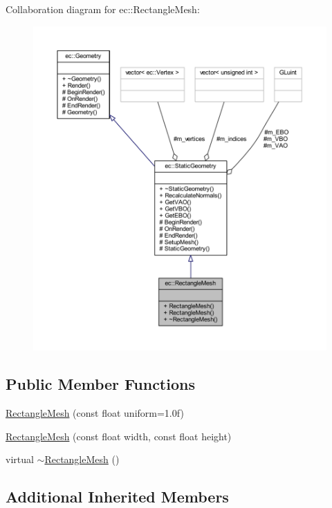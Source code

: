 Collaboration diagram for ec\+:\+:Rectangle\+Mesh\+:
\nopagebreak
\begin{figure}[H]
\begin{center}
\leavevmode
\includegraphics[width=350pt]{classec_1_1_rectangle_mesh__coll__graph}
\end{center}
\end{figure}
\subsection*{Public Member Functions}
\begin{DoxyCompactItemize}
\item 
\mbox{\hyperlink{classec_1_1_rectangle_mesh_aa75e834f688d15a8ec8162e7a9ed1c05}{Rectangle\+Mesh}} (const float uniform=1.\+0f)
\item 
\mbox{\hyperlink{classec_1_1_rectangle_mesh_a7fe73fb3ef2979cb3d7230aaeffeecdd}{Rectangle\+Mesh}} (const float width, const float height)
\item 
virtual \mbox{\hyperlink{classec_1_1_rectangle_mesh_a520388a70dadc70155b2ade95f06d110}{$\sim$\+Rectangle\+Mesh}} ()
\end{DoxyCompactItemize}
\subsection*{Additional Inherited Members}


